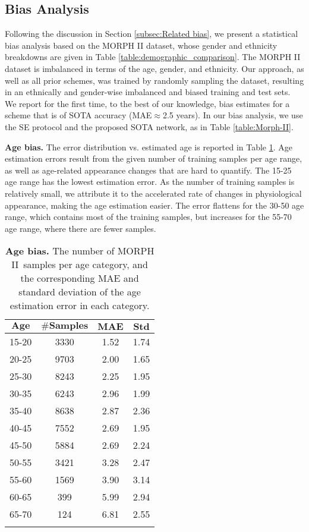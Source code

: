 \documentclass[10pt,journal]{IEEEtran}\usepackage{amsfonts}
\begin{document}
\subsection{Bias Analysis}

\label{subsec:bias}

Following the discussion in Section \ref{subsec:Related bias}, we present a
statistical bias analysis based on the MORPH II dataset, whose gender and
ethnicity breakdowns are given in Table \ref{table:demographic_comparison}.
The MORPH II dataset is imbalanced in terms of the age, gender, and ethnicity.
Our approach, as well as all prior schemes, was trained by randomly sampling
the dataset, resulting in an ethnically and gender-wise imbalanced and biased
training and test sets. We report for the first time, to the best of our
knowledge, bias estimates for a scheme that is of SOTA accuracy (MAE$\approx
$2.5 years). In our bias analysis, we use the SE protocol and the proposed
SOTA network, as in Table \ref{table:Morph-II}.

\vspace{2mm}\noindent\textbf{Age bias.} The error distribution vs. estimated
age is reported in Table \ref{table:morph2_count}. Age estimation errors
result from the given number of training samples per age range, as well as
age-related appearance changes that are hard to quantify. The 15-25 age range
has the lowest estimation error. As the number of training samples is
relatively small, we attribute it to the accelerated rate of changes in
physiological appearance, making the age estimation easier. The error flattens
for the 30-50 age range, which contains most of the training samples, but
increases for the 55-70 age range, where there are fewer
samples.\begin{table}[tbh]
\caption{\textbf{Age bias.} The number of MORPH II\ samples per age category,
and the corresponding MAE and standard deviation of the age estimation error
in each category.}\label{table:morph2_count}
\centering
\renewcommand{\arraystretch}{1.3}
\begin{tabular}
[c]{cccc}\toprule $\mathbf{Age}$ & $\mathbf{\# Samples}$ & $\mathbf{MAE}$ &
$\mathbf{Std}$\\
\midrule 15-20 & 3330 & 1.52 & 1.74\\
20-25 & 9703 & 2.00 & 1.65\\
25-30 & 8243 & 2.25 & 1.95\\
30-35 & 6243 & 2.96 & 1.99\\
35-40 & 8638 & 2.87 & 2.36\\
40-45 & 7552 & 2.69 & 1.95\\
45-50 & 5884 & 2.69 & 2.24\\
50-55 & 3421 & 3.28 & 2.47\\
55-60 & 1569 & 3.90 & 3.14\\
60-65 & 399 & 5.99 & 2.94\\
65-70 & 124 & 6.81 & 2.55\\
\bottomrule &  &  &
\end{tabular}
\end{table}
\end{document}
